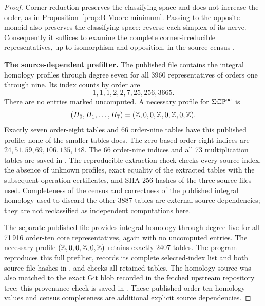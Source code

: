 \begin{proof}
Corner reduction preserves the classifying space and does not increase
the order, as in Proposition~\ref{prop:B-Moore-minimum}. Passing to the
opposite monoid also preserves the classifying space: reverse each
simplex of its nerve. Consequently it suffices to examine the complete
corner-irreducible representatives, up to isomorphism and opposition,
in the source census \cite{SweeneyEnumeration2026B}.

\textbf{The source-dependent prefilter.}
The published file 
contains the integral homology profiles through degree seven for all
3960 representatives of orders one through nine. Its index counts by
order are
\[
 1,1,1,2,2,7,25,256,3665.
\]
There are no entries marked uncomputed. A necessary profile for
$\Sigma\mathbb {CP}^\infty$ is
\[
 (H_0,H_1,\ldots,H_7)
   =(\mathbb Z,0,0,\mathbb Z,0,\mathbb Z,0,\mathbb Z).
\]
Exactly seven order-eight tables and 66 order-nine tables have this
published profile; none of the smaller tables does. The zero-based
order-eight indices are $24,51,59,69,106,135,148$.
The 66 order-nine indices and all 73 multiplication tables are saved
in .
The reproducible extraction check
 checks every source index, the
absence of unknown profiles, exact equality of the extracted tables
with the subsequent operation certificates, and SHA-256 hashes of
the three source files used. Completeness of the census and correctness
of the published integral homology used to discard the other 3887
tables are external source dependencies; they are not reclassified
as independent computations here.

The separate published file
 provides integral
homology through degree five for all 71\,916 order-ten core
representatives, again with no uncomputed entries. The necessary
profile $(\mathbb Z,0,0,\mathbb Z,0,\mathbb Z)$ retains exactly 2407 tables. The program
 reproduces this full prefilter,
records its complete selected-index list and both source-file hashes
in , and checks all
retained tables. The homology source was also matched to the exact
Git blob recorded in the fetched upstream repository tree; this
provenance check is saved in
. These published order-ten
homology values and census completeness are additional explicit
source dependencies.


\end{proof}
